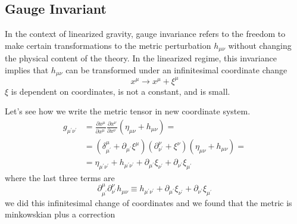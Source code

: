 \subsection{Gauge Invariant}
In the context of linearized gravity, gauge invariance refers to the freedom to make certain transformations to the metric perturbation $h_{\mu \nu }$ without changing the physical content of the theory. In the linearized regime, this invariance implies that $h_{\mu \nu }$ can be transformed under an infinitesimal coordinate change
\[
x^{\mu } \to x^{\mu }+ \xi^{\mu }  
\]
$\xi $ is dependent on coordinates, is not a constant, and is small.\par
Let's see how we write the metric tensor in new coordinate system.
\begin{align}
	g_{\mu ^{\prime }\nu ^{\prime }} &= \frac{\partial x^{\mu }}{\partial x^{\mu ^{\prime }}} \frac{\partial x^{\nu }}{\partial x^{\nu ^{\prime }}} \left( \eta _{\mu \nu } +h_{\mu \nu } \right) = \nonumber\\
					 &= \left( \delta ^{\mu }_{\mu ^{\prime }} + \partial_{\mu ^{\prime }}\xi ^{\mu } \right)\left( \partial^{\nu }_{\nu ^{\prime }}+\xi ^{\nu } \right)\left( \eta _{\mu \nu }+h_{\mu \nu } \right) = \nonumber\\
	&= \eta _{\mu ^{\prime }\nu ^{\prime }} + h_{\mu ^{\prime }\nu ^{\prime }} +\partial_{\mu ^{\prime }}\xi _{\nu ^{\prime }}+\partial_{\nu ^{\prime }}\xi _{\mu ^{\prime }}
\end{align}
where the last three terms are
\begin{equation}
\partial^{\mu }_{\mu ^{\prime }}\partial^{\nu }_{\nu ^{\prime }}h_{\mu \nu } \equiv   h_{\mu ^{\prime }\nu ^{\prime }} +\partial_{\mu ^{\prime }}\xi _{\nu ^{\prime }}+\partial_{\nu ^{\prime }}\xi _{\mu ^{\prime }}
\end{equation}
we did this infinitesimal change of coordinates and we found that the metric is minkowskian plus a correction























